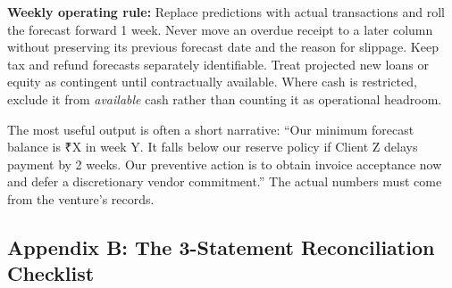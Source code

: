 \textbf{Weekly operating rule:} Replace predictions with actual transactions and roll the forecast forward 1 week. Never move an overdue receipt to a later column without preserving its previous forecast date and the reason for slippage. Keep tax and refund forecasts separately identifiable. Treat projected new loans or equity as contingent until contractually available. Where cash is restricted, exclude it from \emph{available} cash rather than counting it as operational headroom.

The most useful output is often a short narrative: ``Our minimum forecast balance is ₹X in week Y. It falls below our reserve policy if Client Z delays payment by 2 weeks. Our preventive action is to obtain invoice acceptance now and defer a discretionary vendor commitment.'' The actual numbers must come from the venture's records.

\subsection*{Appendix B: The 3-Statement Reconciliation Checklist}

